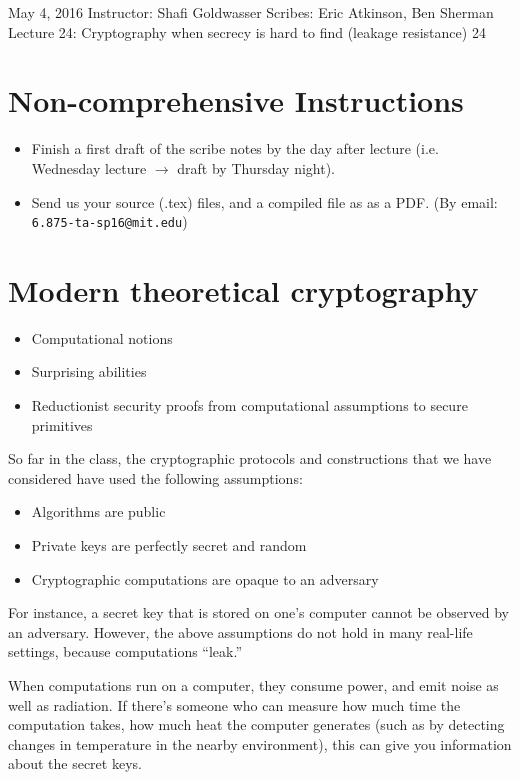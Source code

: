 \documentclass[10pt]{article}
\newcommand{\scribes}{Eric Atkinson, Ben Sherman}
\newcommand{\lecnumber}{24}
\newcommand{\lectitle}{Cryptography when secrecy is hard to find (leakage resistance)}
\newcommand{\thedate}{May 4, 2016}
\begin{document}


{\thedate}
{Instructor: Shafi Goldwasser}
{Scribes: \scribes}
{Lecture \lecnumber: \lectitle}
{\lecnumber}

\section{Non-comprehensive Instructions}
\begin{itemize}
	\item Finish a first draft of the scribe notes by the day after lecture (i.e. Wednesday lecture $\rightarrow$ draft by Thursday night).
	\item Send us your source (.tex) files, and a compiled file as as a PDF. (By email: {\tt 6.875-ta-sp16@mit.edu})
\end{itemize}

\section{Modern theoretical cryptography}

\begin{itemize}
\item Computational notions
\item Surprising abilities
\item Reductionist security proofs from computational assumptions to secure primitives
\end{itemize}

So far in the class, the cryptographic protocols and constructions that we have considered have used the following assumptions:
\begin{itemize}
\item Algorithms are public
\item Private keys are perfectly secret and random
\item Cryptographic computations are opaque to an adversary
\end{itemize}

For instance, a secret key that is stored on one's computer cannot be observed by an adversary. However, the above assumptions do not hold in many real-life settings, because computations ``leak.''

When computations run on a computer, they consume power, and emit noise as well as radiation. If there's someone who can measure how much time the computation takes, how much heat the computer generates (such as by detecting changes in temperature in the nearby environment), this can give you information about the secret keys. 
\end{document}
